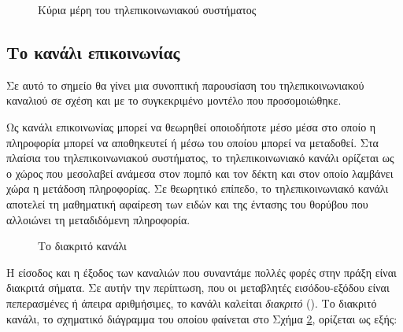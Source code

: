\begin{figure}[h]
\caption{Κύρια μέρη του τηλεπικοινωνιακού συστήματος}
\label{fig:telecom system 2}
\end{figure}

\subsection*{Το κανάλι επικοινωνίας}
Σε αυτό το σημείο θα γίνει μια συνοπτική παρουσίαση του τηλεπικοινωνιακού καναλιού σε σχέση και με το συγκεκριμένο μοντέλο που προσομοιώθηκε.

Ως κανάλι επικοινωνίας μπορεί να θεωρηθεί οποιοδήποτε μέσο μέσα στο οποίο η πληροφορία μπορεί να αποθηκευτεί ή μέσω του οποίου μπορεί να μεταδοθεί. Στα πλαίσια του τηλεπικοινωνιακού συστήματος, το τηλεπικοινωνιακό κανάλι ορίζεται ως ο χώρος που μεσολαβεί ανάμεσα στον πομπό και τον δέκτη και στον οποίο λαμβάνει χώρα η μετάδοση πληροφορίας. Σε θεωρητικό επίπεδο, το τηλεπικοινωνιακό κανάλι αποτελεί τη μαθηματική αφαίρεση των ειδών και της έντασης του θορύβου που αλλοιώνει τη μεταδιδόμενη πληροφορία.

\begin{figure}[h]
\caption{Το διακριτό κανάλι}
\label{fig:discrete channel}
\end{figure}

Η είσοδος και η έξοδος των καναλιών που συναντάμε πολλές φορές στην πράξη είναι διακριτά σήματα. Σε αυτήν την περίπτωση, που οι μεταβλητές εισόδου-εξόδου είναι πεπερασμένες ή άπειρα αριθμήσιμες, το κανάλι καλείται \textit{διακριτό} (). Το διακριτό κανάλι, το σχηματικό διάγραμμα του οποίου φαίνεται στο Σχήμα \ref{fig:discrete channel}, ορίζεται ως εξής:

